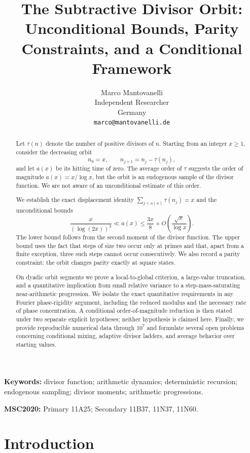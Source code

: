 \documentclass[11pt]{article}
\title{The Subtractive Divisor Orbit:\\
Unconditional Bounds, Parity Constraints, and a Conditional Framework}
\author{
Marco Mantovanelli\\
Independent Researcher\\
Germany\\
\texttt{marco@mantovanelli.de}
}
\date{}
\theoremstyle{definition}
\theoremstyle{remark}
\begin{document}
\maketitle

\begin{abstract}
Let $\tau(n)$ denote the number of positive divisors of $n$.  Starting
from an integer $x\geq 1$, consider the decreasing orbit
\[
 n_0=x,\qquad n_{j+1}=n_j-\tau(n_j),
\]
and let $a(x)$ be its hitting time of zero.  The average order of
$\tau$ suggests the order of magnitude $a(x)\asymp x/\log x$, but the
orbit is an endogenous sample of the divisor function.  We are not
aware of an unconditional estimate of this order.

We establish the exact displacement identity
$\sum_{j<a(x)}\tau(n_j)=x$ and the unconditional bounds
\[
 \frac{x}{(\log(2x))^3}\ll a(x)
 \leq \frac{3x}{8}+O\!\left(\frac{\sqrt{x}}{\log x}\right).
\]
The lower bound follows from the second moment of the divisor function.
The upper bound uses the fact that steps of size two occur only at
primes and that, apart from a finite exception, three such steps cannot
occur consecutively.  We also record a parity constraint: the orbit
changes parity exactly at square states.

On dyadic orbit segments we prove a local-to-global criterion, a
large-value truncation, and a quantitative implication from small
relative variance to a step-mass-saturating near-arithmetic progression.
We isolate the exact quantitative requirements in any Fourier
phase-rigidity argument, including the reduced modulus and the necessary
rate of phase concentration.  A conditional order-of-magnitude
reduction is then stated under two separate explicit hypotheses; neither hypothesis is
claimed here.  Finally, we provide reproducible numerical data through
$10^7$ and formulate several open problems concerning conditional
mixing, adaptive divisor ladders, and average behavior over starting
values.
\end{abstract}

\medskip
\noindent\textbf{Keywords:}
divisor function; arithmetic dynamics; deterministic recursion;
endogenous sampling; divisor moments; arithmetic progressions.

\medskip
\noindent\textbf{MSC2020:}
Primary 11A25; Secondary 11B37, 11N37, 11N60.

\section{Introduction}
\end{document}
